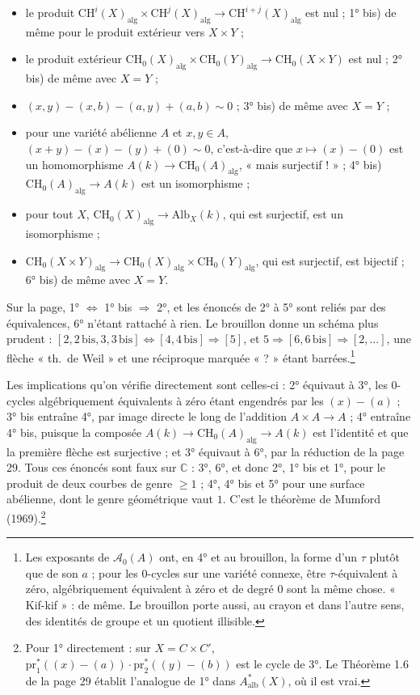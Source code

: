 \documentclass[11pt,a4paper]{article}
\begin{document}
\begin{itemize}
  \item[1°)] le produit $\mathrm{CH}^{i}(X)_{\mathrm{alg}} \times
  \mathrm{CH}^{j}(X)_{\mathrm{alg}} \to \mathrm{CH}^{i+j}(X)_{\mathrm{alg}}$ est
  nul ; 1° bis) de même pour le produit extérieur vers $X \times Y$ ;
  \item[2°)] le produit extérieur $\mathrm{CH}_{0}(X)_{\mathrm{alg}} \times
  \mathrm{CH}_{0}(Y)_{\mathrm{alg}} \to \mathrm{CH}_{0}(X \times Y)$ est nul ; 2°
  bis) de même avec $X = Y$ ;
  \item[3°)] $(x, y) - (x, b) - (a, y) + (a, b) \sim 0$ ; 3° bis) de même avec $X =
  Y$ ;
  \item[4°)] pour une variété abélienne $A$ et $x, y \in A$, $(x + y) - (x) - (y) +
  (0) \sim 0$, c'est-à-dire que $x \mapsto (x) - (0)$ est un homomorphisme $A(k)
  \to \mathrm{CH}_{0}(A)_{\mathrm{alg}}$, « mais surjectif ! » ; 4° bis)
  $\mathrm{CH}_{0}(A)_{\mathrm{alg}} \to A(k)$ est un isomorphisme ;
  \item[5°)] pour tout $X$, $\mathrm{CH}_{0}(X)_{\mathrm{alg}} \to
  \mathrm{Alb}_{X}(k)$, qui est surjectif, est un isomorphisme ;
  \item[6°)] $\mathrm{CH}_{0}(X \times Y)_{\mathrm{alg}} \to
  \mathrm{CH}_{0}(X)_{\mathrm{alg}} \times \mathrm{CH}_{0}(Y)_{\mathrm{alg}}$, qui
  est surjectif, est bijectif ; 6° bis) de même avec $X = Y$.
\end{itemize}

Sur la page, 1° $\Leftrightarrow$ 1° bis $\Rightarrow$ 2°, et les énoncés de 2° à
5° sont reliés par des équivalences, 6° n'étant rattaché à rien. Le brouillon
donne un schéma plus prudent : $[2, 2\,\mathrm{bis}, 3, 3\,\mathrm{bis}]
\Leftrightarrow [4, 4\,\mathrm{bis}] \Rightarrow [5]$, et $5 \Rightarrow [6,
6\,\mathrm{bis}] \Rightarrow [2, \ldots]$, une flèche « th.\ de Weil » et une
réciproque marquée « ? » étant barrées.\footnote{Les exposants de
$\mathcal{A}_{0}(A)$ ont, en 4° et au brouillon, la forme d'un $\tau$ plutôt que
de son $a$ ; pour les $0$-cycles sur une variété connexe, être
$\tau$-équivalent à zéro, algébriquement équivalent à zéro et de degré $0$ sont
la même chose. « Kif-kif » : de même. Le brouillon porte aussi, au crayon et
dans l'autre sens, des identités de groupe et un quotient illisible.}

Les implications qu'on vérifie directement sont celles-ci : 2° équivaut à 3°,
les $0$-cycles algébriquement équivalents à zéro étant engendrés par les $(x) -
(a)$ ; 3° bis entraîne 4°, par image directe le long de l'addition $A \times A
\to A$ ; 4° entraîne 4° bis, puisque la composée $A(k) \to
\mathrm{CH}_{0}(A)_{\mathrm{alg}} \to A(k)$ est l'identité et que la première
flèche est surjective ; et 3° équivaut à 6°, par la réduction de la page 29.
Tous ces énoncés sont faux sur $\mathbb{C}$ : 3°, 6°, et donc 2°, 1° bis et 1°,
pour le produit de deux courbes de genre $\geqslant 1$ ; 4°, 4° bis et 5° pour une
surface abélienne, dont le genre géométrique vaut $1$. C'est le théorème de
Mumford (1969).\footnote{Pour 1° directement : sur $X = C \times C'$,
$\mathrm{pr}_{1}^{*}((x) - (a)) \cdot \mathrm{pr}_{2}^{*}((y) - (b))$ est le cycle
de 3°. Le Théorème 1.6 de la page 29 établit l'analogue de 1° dans
$A^{*}_{\mathrm{alb}}(X)$, où il est vrai.}
\end{document}

